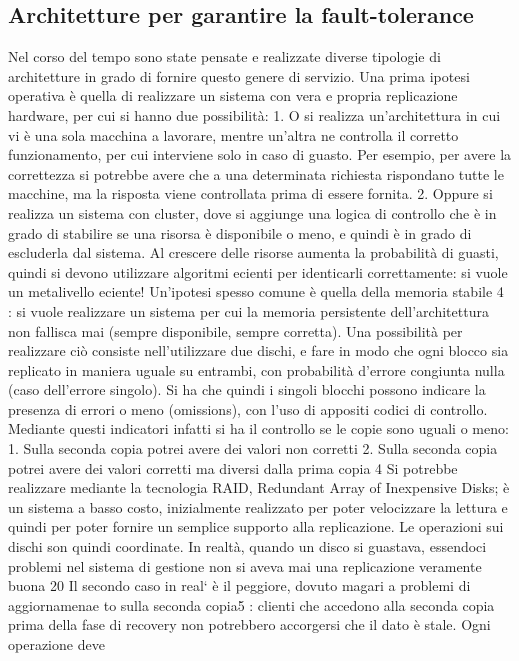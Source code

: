 \subsection{Architetture per garantire la fault-tolerance}
Nel corso del tempo sono state pensate e realizzate diverse tipologie di architetture in grado di fornire questo genere
di servizio.
Una prima ipotesi operativa è quella di realizzare un sistema con vera e
propria replicazione hardware, per cui si hanno due possibilità:
1. O si realizza un'architettura in cui vi è una sola macchina a lavorare,
mentre un'altra ne controlla il corretto funzionamento, per cui interviene
solo in caso di guasto. Per esempio, per avere la correttezza si potrebbe
avere che a una determinata richiesta rispondano tutte le macchine, ma
la risposta viene controllata prima di essere fornita.
2. Oppure si realizza un sistema con cluster, dove si aggiunge una logica di
controllo che è in grado di stabilire se una risorsa è disponibile o meno,
e quindi è in grado di escluderla dal sistema. Al crescere delle risorse
aumenta la probabilità di guasti, quindi si devono utilizzare algoritmi
ecienti per identicarli correttamente: si vuole un metalivello eciente!
Un'ipotesi spesso comune è quella della memoria stabile 4 : si vuole realizzare
un sistema per cui la memoria persistente dell'architettura non fallisca mai
(sempre disponibile, sempre corretta). Una possibilità per realizzare ciò consiste
nell'utilizzare due dischi, e fare in modo che ogni blocco sia replicato in maniera
uguale su entrambi, con probabilità d'errore congiunta nulla (caso dell'errore
singolo). Si ha che quindi i singoli blocchi possono indicare la presenza di errori
o meno (omissions), con l'uso di appositi codici di controllo. Mediante questi
indicatori infatti si ha il controllo se le copie sono uguali o meno:
1. Sulla seconda copia potrei avere dei valori non corretti
2. Sulla seconda copia potrei avere dei valori corretti ma diversi dalla prima
copia
4 Si potrebbe realizzare mediante la tecnologia RAID, Redundant Array of Inexpensive
Disks; è un sistema a basso costo, inizialmente realizzato per poter velocizzare la lettura e
quindi per poter fornire un semplice supporto alla replicazione. Le operazioni sui dischi son
quindi coordinate. In realtà, quando un disco si guastava, essendoci problemi nel sistema di
gestione non si aveva mai una replicazione veramente buona
20
Il secondo caso in real` è il peggiore, dovuto magari a problemi di aggiornamenae
to sulla seconda copia5 : clienti che accedono alla seconda copia prima della fase
di recovery non potrebbero accorgersi che il dato è stale. Ogni operazione deve
